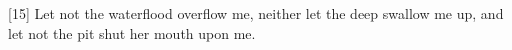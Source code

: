 [15] \textcolor[cmyk]{0.99998,1,0,0}{Let not the waterflood overflow me, neither let the deep swallow me up, and let not the pit shut her mouth upon me.}
